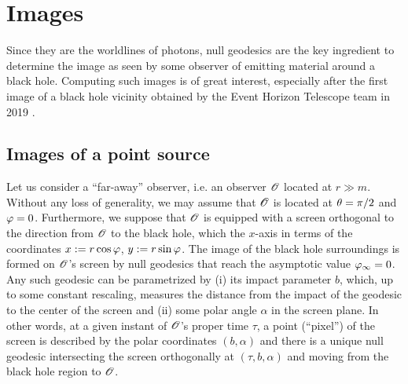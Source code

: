 
\section{Images}

Since they are the worldlines of photons, null geodesics are the key ingredient to
determine the image as seen by some observer of emitting material around
a black hole. Computing such images is of great interest, especially after
the first image of a black hole vicinity obtained by
the Event Horizon Telescope team in 2019 \cite{EHT19a,Cardo19}.

\subsection{Images of a point source}

Let us consider a ``far-away'' observer, i.e. an observer $\mathscr{O}$ located at $r\gg m$. Without
any loss of generality, we may assume that $\mathscr{O}$ is located at $\theta=\pi/2$ and $\varphi=0$.
Furthermore, we suppose that $\mathscr{O}$ is
equipped with a screen orthogonal to the direction from $\mathscr{O}$ to the black hole, which
the $x$-axis in terms of the coordinates $x:=r\cos\varphi$, $y:=r\sin\varphi$.
The image of the black hole surroundings is formed on $\mathscr{O}$'s screen by null geodesics
that reach the asymptotic value $\varphi_\infty = 0$. Any such geodesic can be parametrized by
(i) its impact parameter $b$, which, up to some constant rescaling, measures the distance from
the impact of the geodesic to the center of the screen and (ii) some polar angle $\alpha$ in the screen plane.
In other words,
at a given instant of $\mathscr{O}$'s proper time $\tau$, a point (``pixel'') of the screen is
described by the polar coordinates $(b,\alpha)$ and there is a unique null geodesic intersecting
the screen orthogonally at $(\tau,b,\alpha)$ and moving from the black hole region to $\mathscr{O}$.

